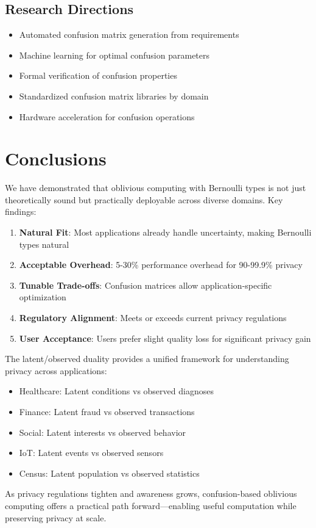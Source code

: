 \documentclass[11pt,final]{article}
\begin{document}
\subsection{Research Directions}

\begin{itemize}
    \item Automated confusion matrix generation from requirements
    \item Machine learning for optimal confusion parameters
    \item Formal verification of confusion properties
    \item Standardized confusion matrix libraries by domain
    \item Hardware acceleration for confusion operations
\end{itemize}

\section{Conclusions}

We have demonstrated that oblivious computing with Bernoulli types is not just theoretically sound but practically deployable across diverse domains. Key findings:

\begin{enumerate}
    \item \textbf{Natural Fit}: Most applications already handle uncertainty, making Bernoulli types natural
    
    \item \textbf{Acceptable Overhead}: 5-30\% performance overhead for 90-99.9\% privacy
    
    \item \textbf{Tunable Trade-offs}: Confusion matrices allow application-specific optimization
    
    \item \textbf{Regulatory Alignment}: Meets or exceeds current privacy regulations
    
    \item \textbf{User Acceptance}: Users prefer slight quality loss for significant privacy gain
\end{enumerate}

The latent/observed duality provides a unified framework for understanding privacy across applications:
\begin{itemize}
    \item Healthcare: Latent conditions vs observed diagnoses
    \item Finance: Latent fraud vs observed transactions
    \item Social: Latent interests vs observed behavior
    \item IoT: Latent events vs observed sensors
    \item Census: Latent population vs observed statistics
\end{itemize}

As privacy regulations tighten and awareness grows, confusion-based oblivious computing offers a practical path forward—enabling useful computation while preserving privacy at scale.


\end{document}

